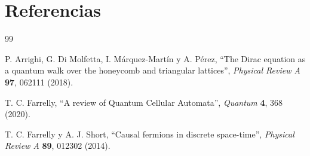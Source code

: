 \chapter*{Referencias}

\begin{thebibliography}{99}

P. Arrighi, G. Di Molfetta, I. M\'arquez-Mart\'in y A. P\'erez,
\newblock \enquote{The Dirac equation as a quantum walk over the honeycomb and triangular lattices},
\newblock \emph{Physical Review A} \textbf{97}, 062111 (2018).

T. C. Farrelly,
\newblock \enquote{A review of Quantum Cellular Automata},
\newblock \emph{Quantum} \textbf{4}, 368 (2020).

T. C. Farrelly y A. J. Short,
\newblock \enquote{Causal fermions in discrete space-time},
\newblock \emph{Physical Review A} \textbf{89}, 012302 (2014).

\end{thebibliography}
